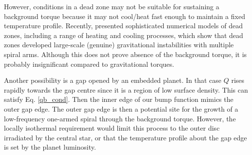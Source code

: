 {  However, conditions in a dead zone may not be suitable for 
  sustaining a background torque because it may not cool/heat fast enough
  to maintain a fixed temperature profile. Recently, 
  \cite{bae14} presented sophisticated numerical models of
  dead zones, including a range of heating and 
  cooling processes, which show that dead zones developed large-scale
  (genuine) gravitational instabilities with multiple spiral
  arms. Although this does not prove absence of the background torque,
  it is probably insignificant compared to gravitational torques. 


  Another possibility is a gap opened by an embedded planet. In that case $Q$
  rises rapidly towards the gap centre since it is a region of low
  surface density. This can satisfy Eq. \ref{qb_cond}. Then the inner
  edge of our bump function mimics the outer gap edge. The outer gap
  edge is then a potential site for the growth of a low-frequency
  one-armed spiral through the background torque. However, the
  locally isothermal requirement would limit this process to the
  outer disc irradiated by the central star, or that the temperature
  profile about the gap edge is set by the planet luminosity.  
}




